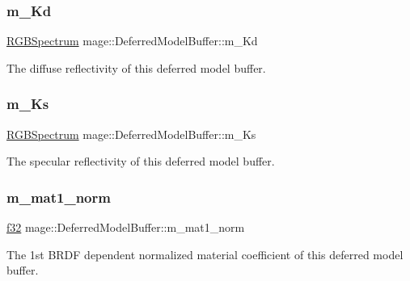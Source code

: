 \subsubsection{\texorpdfstring{m\+\_\+\+Kd}{m\_Kd}}
{\footnotesize\ttfamily \hyperlink{structmage_1_1_r_g_b_spectrum}{R\+G\+B\+Spectrum} mage\+::\+Deferred\+Model\+Buffer\+::m\+\_\+\+Kd}

The diffuse reflectivity of this deferred model buffer. \hypertarget{structmage_1_1_deferred_model_buffer_acff69877b5817d1d531cd9e1983e44d2}{}\label{structmage_1_1_deferred_model_buffer_acff69877b5817d1d531cd9e1983e44d2} 
\subsubsection{\texorpdfstring{m\+\_\+\+Ks}{m\_Ks}}
{\footnotesize\ttfamily \hyperlink{structmage_1_1_r_g_b_spectrum}{R\+G\+B\+Spectrum} mage\+::\+Deferred\+Model\+Buffer\+::m\+\_\+\+Ks}

The specular reflectivity of this deferred model buffer. \hypertarget{structmage_1_1_deferred_model_buffer_addfcf1f4f721df5d5b78c33cfa423570}{}\label{structmage_1_1_deferred_model_buffer_addfcf1f4f721df5d5b78c33cfa423570} 
\subsubsection{\texorpdfstring{m\+\_\+mat1\+\_\+norm}{m\_mat1\_norm}}
{\footnotesize\ttfamily \hyperlink{namespacemage_a6a44ad388483959dc4dff9f2aef91431}{f32} mage\+::\+Deferred\+Model\+Buffer\+::m\+\_\+mat1\+\_\+norm}

The 1st B\+R\+DF dependent normalized material coefficient of this deferred model buffer. \hypertarget{structmage_1_1_deferred_model_buffer_a2d9e491ddcba28b6cf0d09921a05a1d0}{}\label{structmage_1_1_deferred_model_buffer_a2d9e491ddcba28b6cf0d09921a05a1d0} 
